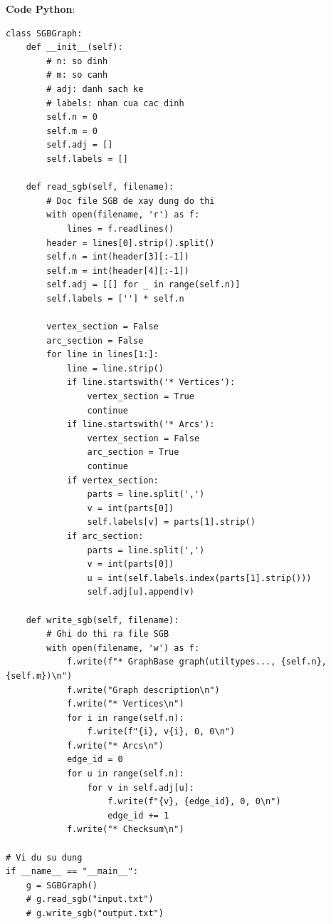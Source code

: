 \documentclass[a4paper,12pt]{article}
\begin{document}
\textbf{Code Python}:
\lstset{language=Python}
\begin{lstlisting}
class SGBGraph:
    def __init__(self):
        # n: so dinh
        # m: so canh
        # adj: danh sach ke
        # labels: nhan cua cac dinh
        self.n = 0
        self.m = 0
        self.adj = []
        self.labels = []

    def read_sgb(self, filename):
        # Doc file SGB de xay dung do thi
        with open(filename, 'r') as f:
            lines = f.readlines()
        header = lines[0].strip().split()
        self.n = int(header[3][:-1])
        self.m = int(header[4][:-1])
        self.adj = [[] for _ in range(self.n)]
        self.labels = [''] * self.n

        vertex_section = False
        arc_section = False
        for line in lines[1:]:
            line = line.strip()
            if line.startswith('* Vertices'):
                vertex_section = True
                continue
            if line.startswith('* Arcs'):
                vertex_section = False
                arc_section = True
                continue
            if vertex_section:
                parts = line.split(',')
                v = int(parts[0])
                self.labels[v] = parts[1].strip()
            if arc_section:
                parts = line.split(',')
                v = int(parts[0])
                u = int(self.labels.index(parts[1].strip()))
                self.adj[u].append(v)

    def write_sgb(self, filename):
        # Ghi do thi ra file SGB
        with open(filename, 'w') as f:
            f.write(f"* GraphBase graph(utiltypes..., {self.n}, {self.m})\n")
            f.write("Graph description\n")
            f.write("* Vertices\n")
            for i in range(self.n):
                f.write(f"{i}, v{i}, 0, 0\n")
            f.write("* Arcs\n")
            edge_id = 0
            for u in range(self.n):
                for v in self.adj[u]:
                    f.write(f"{v}, {edge_id}, 0, 0\n")
                    edge_id += 1
            f.write("* Checksum\n")

# Vi du su dung
if __name__ == "__main__":
    g = SGBGraph()
    # g.read_sgb("input.txt")
    # g.write_sgb("output.txt")
\end{lstlisting}
\end{document}
